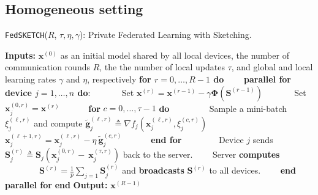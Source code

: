 \subsection{Homogeneous setting}
\begin{algorithm}[H]
\caption{\texttt{FedSKETCH}($R$, $\tau, \eta, \gamma$): Private Federated Learning with Sketching. }\label{Alg:PFLHom}
\begin{algorithmic}[1]
\State \textbf{Inputs:} $\boldsymbol{x}^{(0)}$ as an initial  model shared by all local devices, the number of communication rounds $R$, the the number of local updates $\tau$, and global and local learning rates $\gamma$ and $\eta$, respectively
\State \textbf{for $r=0, \ldots, R-1$ do}
\State $\qquad$\textbf{parallel for device $j=1,\ldots,n$ do}:
\State $\qquad\quad$ Set $\boldsymbol{x}^{(r)}=\boldsymbol{x}^{(r-1)}-\gamma{\mathbf{\Phi}}\left({\mathbf{S}}^{(r-1)}\right)$ 
\State $\qquad\quad$ Set $\boldsymbol{x}_j^{(0,r)}=\boldsymbol{x}^{(r)}$ 
\State $\qquad\quad $\textbf{for} $c=0,\ldots,\tau-1$ \textbf{do}
\State $\qquad\quad\quad$ Sample a mini-batch $\xi_j^{(\ell,r)}$ and compute $\tilde{\mathbf{g}}_{j}^{(\ell,r)}\triangleq\nabla{f}_j(\boldsymbol{x}^{(\ell,r)}_j,\xi_j^{(c,r)})$
\State $\qquad\quad\quad$ $\boldsymbol{x}^{(\ell+1,r)}_{j}=\boldsymbol{x}^{(\ell,r)}_j-\eta~ \tilde{\mathbf{g}}_{j}^{(c,r)}$ \label{eq:update-rule-alg}
\State $\qquad\quad$\textbf{end for}
\State $\qquad\quad\quad$Device $j$ sends $\mathbf{S}^{(r)}_{j}\triangleq\mathbf{S}_{j}\left(\boldsymbol{x}_j^{(0,r)}-~{\boldsymbol{x}}_{j}^{(\tau,r)}\right)$ back to the server.
\State $\qquad$Server \textbf{computes} 
\State $\qquad\qquad {\mathbf{S}}^{(r)}=\frac{1}{p}\sum_{j=1}\mathbf{S}^{(r)}_{j}$ and \textbf{broadcasts} ${\mathbf{S}}^{(r)}$ to all devices.
\State $\qquad$\textbf{end parallel for}
\State \textbf{end}
\State \textbf{Output:} ${\boldsymbol{x}}^{(R-1)}$
\vspace{- 0.1cm}
\end{algorithmic}
\end{algorithm}

